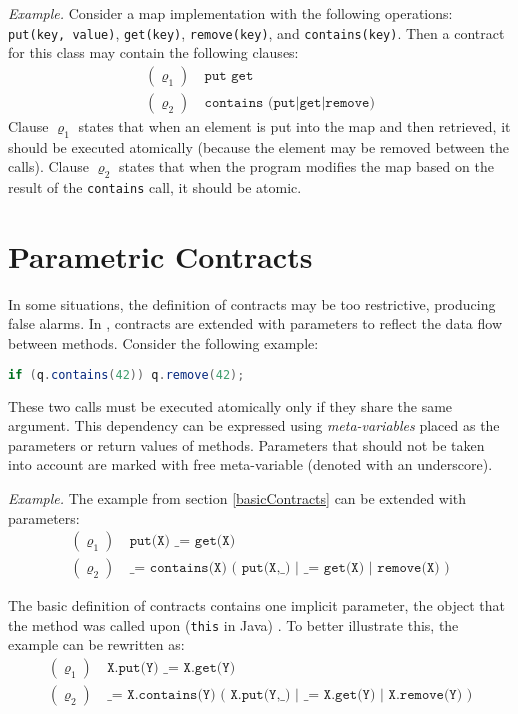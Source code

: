 \emph{Example.} Consider a map implementation with the following operations:
\texttt{put(key, value)}, \texttt{get(key)}, \texttt{remove(key)}, and
\texttt{contains(key)}. Then a contract for this class may contain the following
clauses:
\begin{align*}
    (\varrho_1) &\ \texttt{put get}\\
    (\varrho_2) &\ \texttt{contains (put|get|remove)}
\end{align*}
Clause $\varrho_1$ states that when an element is put into the map and then
retrieved, it should be executed atomically (because the element may be removed
between the calls). Clause $\varrho_2$ states that when the program modifies the
map based on the result of the \texttt{contains} call, it should be atomic.

\section{Parametric Contracts}
\label{parametricContracts}

In some situations, the definition of contracts may be too restrictive,
producing false alarms. In \cite{contracts}, contracts are extended with
parameters to reflect the data flow between methods. Consider the following
example:
\begin{lstlisting}[language=java]
if (q.contains(42)) q.remove(42);
\end{lstlisting}

These two calls must be executed atomically only if they share the same
argument. This dependency can be expressed using \emph{meta-variables} placed as
the parameters or return values of methods. Parameters that should not be taken
into account are marked with free meta-variable (denoted with an underscore).

\emph{Example.} The example from section \ref{basicContracts} can be extended
with parameters:
\begin{align*}
    (\varrho_1) &\ \texttt{put(X) \_ = get(X)}\\
    (\varrho_2) &\ \texttt{\_ = contains(X) ( put(X,\_) | \_ = get(X) |
    remove(X) )}
\end{align*}

The basic definition of contracts contains one implicit parameter, the object
that the method was called upon (\texttt{this} in Java) \cite{FITPUB10817}. To
better illustrate this, the example can be rewritten as:
\begin{align*}
    (\varrho_1) &\ \texttt{X.put(Y) \_ = X.get(Y)}\\
    (\varrho_2) &\ \texttt{\_ = X.contains(Y) ( X.put(Y,\_) | \_ = X.get(Y) |
    X.remove(Y) )}
\end{align*}


